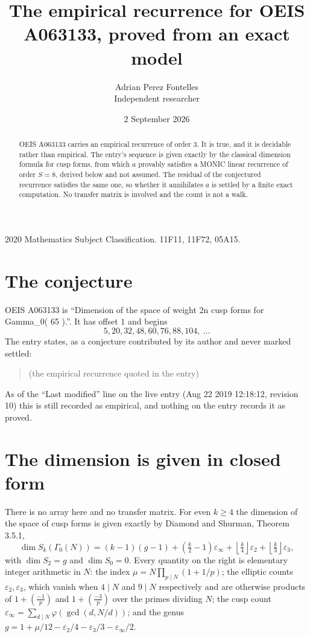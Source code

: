 \documentclass[11pt,a4paper]{article}
\title{The empirical recurrence for OEIS A063133, proved from an exact model}
\author{Adrian Perez Fontelles\\ \small Independent researcher}
\date{2 September 2026}
\theoremstyle{plain}
\theoremstyle{definition}
\begin{document}
\maketitle

\begin{abstract}
OEIS A063133 carries an empirical recurrence of order $3$. It is true, and it is
decidable rather than empirical. The entry's sequence is given exactly by the classical dimension formula for cusp forms, from
which $a$ provably satisfies a MONIC linear recurrence of order $S=8$, derived below and not
assumed. The residual of the conjectured recurrence satisfies the same one, so whether it
annihilates $a$ is settled by a finite exact computation. No transfer matrix is involved and
the count is not a walk.
\end{abstract}

\noindent\small 2020 Mathematics Subject Classification. 11F11, 11F72, 05A15.\normalsize

\section{The conjecture}

OEIS A063133 is ``Dimension of the space of weight 2n cusp forms for Gamma\_0( 65 ).''. It has offset $1$ and begins
\[
5, 20, 32, 48, 60, 76, 88, 104,\ \dots
\]
The entry states, as a conjecture contributed by its author and never marked settled:
\begin{quote}
(the empirical recurrence quoted in the entry)
\end{quote}
As of the ``Last modified'' line on the live entry (Aug 22 2019 12:18:12, revision 10)
this is still recorded as empirical, and nothing on the entry records it as proved.

\section{The dimension is given in closed form}

There is no array here and no transfer matrix. For even $k\ge4$ the dimension of the space of
cusp forms is given exactly by Diamond and Shurman, Theorem 3.5.1,
\[
\dim S_k(\Gamma_0(N))=(k-1)(g-1)+\left(\tfrac{k}{2}-1\right)\varepsilon_\infty
+\left\lfloor\tfrac{k}{4}\right\rfloor\varepsilon_2
+\left\lfloor\tfrac{k}{3}\right\rfloor\varepsilon_3 ,
\]
with $\dim S_2=g$ and $\dim S_0=0$. Every quantity on the right is elementary integer
arithmetic in $N$: the index $\mu=N\prod_{p\mid N}(1+1/p)$; the elliptic counts
$\varepsilon_2,\varepsilon_3$, which vanish when $4\mid N$ and $9\mid N$ respectively and are
otherwise products of $1+\left(\frac{-1}{p}\right)$ and $1+\left(\frac{-3}{p}\right)$
over the primes dividing $N$; the cusp count
$\varepsilon_\infty=\sum_{d\mid N}\varphi(\gcd(d,N/d))$; and the genus
$g=1+\mu/12-\varepsilon_2/4-\varepsilon_3/3-\varepsilon_\infty/2$.
\end{document}
